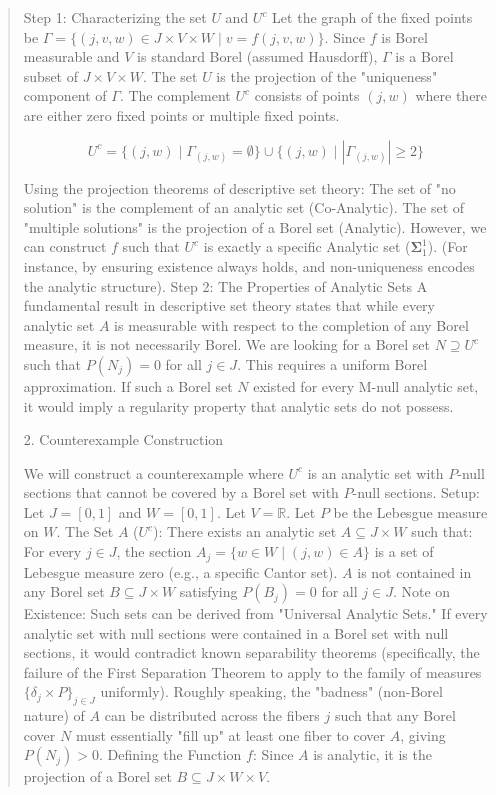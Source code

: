 \begin{Rem}
{\begin{quote}
Step 1: Characterizing the set $U$ and $U^c$
Let the graph of the fixed points be $\Gamma = \{ (j, v, w) \in J \times V \times W \mid v = f(j, v, w) \}$. Since $f$ is Borel measurable and $V$ is standard Borel (assumed Hausdorff), $\Gamma$ is a Borel subset of $J \times V \times W$.
The set $U$ is the projection of the "uniqueness" component of $\Gamma$. The complement $U^c$ consists of points $(j, w)$ where there are either zero fixed points or multiple fixed points.


$$U^c = \{ (j, w) \mid \Gamma_{(j,w)} = \emptyset \} \cup \{ (j, w) \mid |\Gamma_{(j,w)}| \ge 2 \}$$

Using the projection theorems of descriptive set theory:
The set of "no solution" is the complement of an analytic set (Co-Analytic).
The set of "multiple solutions" is the projection of a Borel set (Analytic).
However, we can construct $f$ such that $U^c$ is exactly a specific Analytic set ($\mathbf{\Sigma}^1_1$). (For instance, by ensuring existence always holds, and non-uniqueness encodes the analytic structure).
Step 2: The Properties of Analytic Sets
A fundamental result in descriptive set theory states that while every analytic set $A$ is measurable with respect to the completion of any Borel measure, it is not necessarily Borel.
We are looking for a Borel set $N \supseteq U^c$ such that $P(N_j) = 0$ for all $j \in J$.
This requires a uniform Borel approximation. If such a Borel set $N$ existed for every M-null analytic set, it would imply a regularity property that analytic sets do not possess.

2. Counterexample Construction

We will construct a counterexample where $U^c$ is an analytic set with $P$-null sections that cannot be covered by a Borel set with $P$-null sections.
Setup:
Let $J = [0,1]$ and $W = [0,1]$.
Let $V = \mathbb{R}$.
Let $P$ be the Lebesgue measure on $W$.
The Set $A$ ($U^c$):
There exists an analytic set $A \subseteq J \times W$ such that:
For every $j \in J$, the section $A_j = \{ w \in W \mid (j, w) \in A \}$ is a set of Lebesgue measure zero (e.g., a specific Cantor set).
$A$ is not contained in any Borel set $B \subseteq J \times W$ satisfying $P(B_j) = 0$ for all $j \in J$.
Note on Existence: Such sets can be derived from "Universal Analytic Sets." If every analytic set with null sections were contained in a Borel set with null sections, it would contradict known separability theorems (specifically, the failure of the First Separation Theorem to apply to the family of measures $\{\delta_j \times P\}_{j \in J}$ uniformly). Roughly speaking, the "badness" (non-Borel nature) of $A$ can be distributed across the fibers $j$ such that any Borel cover $N$ must essentially "fill up" at least one fiber to cover $A$, giving $P(N_j) > 0$.
Defining the Function $f$:
Since $A$ is analytic, it is the projection of a Borel set $B \subseteq J \times W \times V$.



\end{quote}}
\end{Rem}
